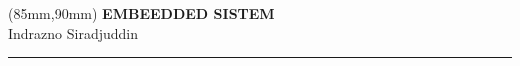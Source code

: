 \documentclass[12pt]{extreport}
\begin{document}



	\thispagestyle{empty}
	\begin{textblock*}{60mm}(85mm,90mm)
	\noindent
	{\sffamily\LARGE\bfseries EMBEEDDED SISTEM}\\
	\noindent
	{\sffamily\small Indrazno Siradjuddin}\\
	{\color{dark-gray}\rule[5pt]{170pt}{3pt}}
	\end{textblock*}
	\null\newpage



	\thispagestyle{empty}
	\null\newpage

	\renewcommand\contentsname{Table of Contents} %
	\tableofcontents

	

	\thispagestyle{empty}
	\null\newpage

	\setcounter{page}{1}
	


	
	\ifodd\value{page}
	\thispagestyle{empty}
	\null\newpage
	\fi
\end{document}

